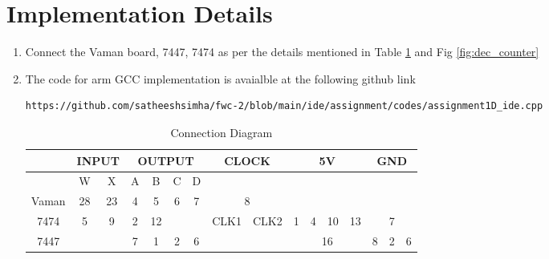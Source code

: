 \documentclass[journal,12pt,twocolumn]{IEEEtran}
\begin{document}
\section{\textbf{Implementation Details}}
\begin{enumerate}[1.]

\item Connect the Vaman board, 7447, 7474 as per the details mentioned in Table \ref{table:Connection_table} and Fig \ref{fig:dec_counter}

\item The code for arm GCC implementation is avaialble at the following github link

\begin{lstlisting}
https://github.com/satheeshsimha/fwc-2/blob/main/ide/assignment/codes/assignment1D_ide.cpp
\end{lstlisting}

\vspace{9cm}

\begin{table}[h!]
	\begin{center}
		\begin{tabular}{ |c|c|c|c|c|c|c|c|c|c|c|c|c|c|c|c| } 
			\hline
			\multicolumn{1}{|c|}{} &\multicolumn{2}{|c|}{\textbf{INPUT}} & \multicolumn{4}{|c|}{\textbf{OUTPUT}} &\multicolumn{2}{|c|}{\textbf{CLOCK}} &\multicolumn{4}{|c|}{\textbf{5V}} &\multicolumn{3}{|c|}{\textbf{GND}}\\
			\hline
			\multicolumn{1}{|c|}{} & \multicolumn{1}{|c|}{W} & \multicolumn{1}{|c|}{X} & \multicolumn{1}{|c|}{A} & \multicolumn{1}{|c|}{B} & \multicolumn{1}{|c|}{C} & \multicolumn{1}{|c|}{D}& \multicolumn{2}{|c|}{} & \multicolumn{4}{|c|}{} & \multicolumn{3}{|c|}{}   \\
			\hline
			\multicolumn{1}{|c|}{Vaman} & \multicolumn{1}{|c|}{28} & \multicolumn{1}{|c|}{23} & \multicolumn{1}{|c|}{4} & \multicolumn{1}{|c|}{5} & \multicolumn{1}{|c|}{6} & \multicolumn{1}{|c|}{7} & \multicolumn{2}{|c|}{8} & \multicolumn{4}{|c|}{} & \multicolumn{3}{|c|}{}\\
			\hline
			\multicolumn{1}{|c|}{7474} & \multicolumn{1}{|c|}{5} & \multicolumn{1}{|c|}{9} & \multicolumn{1}{|c|}{2} & \multicolumn{1}{|c|}{12} & \multicolumn{2}{|c|}{} & \multicolumn{1}{|c|}{CLK1} & \multicolumn{1}{|c|}{CLK2} & \multicolumn{1}{|c|}{1} & \multicolumn{1}{|c|}{4} & \multicolumn{1}{|c|}{10} & \multicolumn{1}{|c|}{13} & \multicolumn{3}{|c|}{7} \\
			\hline
			\multicolumn{1}{|c|}{7447} & \multicolumn{2}{|c|}{} & \multicolumn{1}{|c|}{7} & \multicolumn{1}{|c|}{1} & \multicolumn{1}{|c}{2} & \multicolumn{1}{|c|}{6} & \multicolumn{2}{|c|}{} & \multicolumn{4}{|c|}{16} & \multicolumn{1}{|c|}{8} & \multicolumn{1}{|c|}{2} & \multicolumn{1}{|c|}{6}\\
			\hline
		\end{tabular}
		\caption{Connection Diagram}
		\label{table:Connection_table}
	\end{center}
\end{table}


\end{enumerate}
\end{document}
